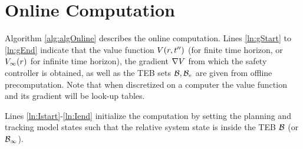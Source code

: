 \section{Online Computation \label{sec:online}}
Algorithm \ref{alg:algOnline} describes the online computation. 
Lines \ref{ln:gStart} to \ref{ln:gEnd} indicate that the value function $V(r,t'')$ (for finite time horizon, or $V_\infty(r)$ for infinite time horizon), the gradient $\nabla V$ from which the safety controller is obtained, as well as the TEB sets $\mathcal B,\mathcal B_e$ are given from offline precomputation. 
Note that when discretized on a computer the value function and its gradient will be look-up tables.

Lines \ref{ln:Istart}-\ref{ln:Iend} initialize the computation by setting the planning and tracking model states such that the relative system state is inside the TEB $\mathcal B$ (or $\mathcal B_\infty$). 

